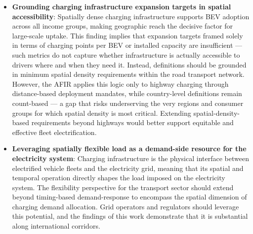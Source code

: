 \begin{itemize}
    
    \item[(ii)] \textbf{Grounding charging infrastructure expansion targets in spatial accessibility}: Spatially dense charging infrastructure supports \ac{BEV} adoption across all income groups, making geographic reach the decisive factor for large-scale uptake. This finding implies that expansion targets framed solely in terms of charging points per \ac{BEV} or installed capacity are insufficient — such metrics do not capture whether infrastructure is actually accessible to drivers where and when they need it. Instead, definitions should be grounded in minimum spatial density requirements within the road transport network. However, the AFIR applies this logic only to highway charging through distance-based deployment mandates, while country-level definitions remain count-based — a gap that risks underserving the very regions and consumer groups for which spatial density is most critical. Extending spatial-density-based requirements beyond highways would better support equitable and effective fleet electrification.
    
    \item[(iii)] \textbf{Leveraging spatially flexible load as a demand-side resource for the electricity system}: Charging infrastructure is the physical interface between electrified vehicle fleets and the electricity grid, meaning that its spatial and temporal operation directly shapes the load imposed on the electricity system. The flexibility perspective for the transport sector should extend beyond timing-based demand-response to encompass the spatial dimension of charging demand allocation. Grid operators and regulators should leverage this potential, and the findings of this work demonstrate that it is substantial along international corridors.
    
\end{itemize}

